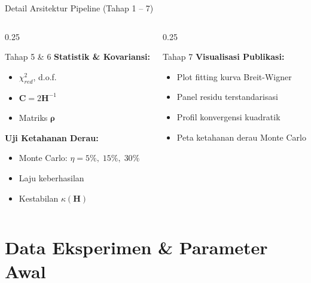 \documentclass[aspectratio=169, 10pt]{beamer}
\begin{document}
\begin{frame}{Detail Arsitektur Pipeline (Tahap 1 -- 7)}
\begin{columns}[T]
		\begin{column}{0.25\textwidth}
			\begin{block}{Tahap 5 \& 6}
				\scriptsize
				\textbf{Statistik \& Kovariansi:}
				\begin{itemize}
					\item $\chi^2_{red}$, d.o.f.
					\item $\mathbf{C} = 2\mathbf{H}^{-1}$
					\item Matriks $\boldsymbol{\rho}$
				\end{itemize}
				\textbf{Uji Ketahanan Derau:}
				\begin{itemize}
					\item Monte Carlo: $\eta = 5\%,\;15\%,\;30\%$
					\item Laju keberhasilan
					\item Kestabilan $\kappa(\mathbf{H})$
				\end{itemize}
			\end{block}
		\end{column}

		\begin{column}{0.25\textwidth}
			\begin{block}{Tahap 7}
				\scriptsize
				\textbf{Visualisasi Publikasi:}
				\begin{itemize}
					\item Plot fitting kurva Breit-Wigner
					\item Panel residu terstandarisasi
					\item Profil konvergensi kuadratik
					\item Peta ketahanan derau Monte Carlo
				\end{itemize}
			\end{block}
		\end{column}
	\end{columns}
\end{frame}


\section{Data Eksperimen \& Parameter Awal}
\end{document}
